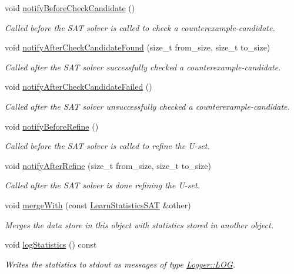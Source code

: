 \begin{DoxyCompactItemize}
void \hyperlink{classLearnStatisticsSAT_aafb51499184443e1c38eeec61370b96a}{notify\-Before\-Check\-Candidate} ()
\begin{DoxyCompactList}\small\item\em Called before the S\-A\-T solver is called to check a counterexample-\/candidate. \end{DoxyCompactList}\item 
void \hyperlink{classLearnStatisticsSAT_a229bd4450b739bc802dff5c43a8e212b}{notify\-After\-Check\-Candidate\-Found} (size\-\_\-t from\-\_\-size, size\-\_\-t to\-\_\-size)
\begin{DoxyCompactList}\small\item\em Called after the S\-A\-T solver successfully checked a counterexample-\/candidate. \end{DoxyCompactList}\item 
void \hyperlink{classLearnStatisticsSAT_a84d6d5295f13de1943cf236565f0d135}{notify\-After\-Check\-Candidate\-Failed} ()
\begin{DoxyCompactList}\small\item\em Called after the S\-A\-T solver unsuccessfully checked a counterexample-\/candidate. \end{DoxyCompactList}\item 
void \hyperlink{classLearnStatisticsSAT_a2734b3bcda5ca2195ecdb174d98a1433}{notify\-Before\-Refine} ()
\begin{DoxyCompactList}\small\item\em Called before the S\-A\-T solver is called to refine the U-\/set. \end{DoxyCompactList}\item 
void \hyperlink{classLearnStatisticsSAT_a0f5e0bc85daa6d051b1cd0144b1f5bda}{notify\-After\-Refine} (size\-\_\-t from\-\_\-size, size\-\_\-t to\-\_\-size)
\begin{DoxyCompactList}\small\item\em Called after the S\-A\-T solver is done refining the U-\/set. \end{DoxyCompactList}\item 
void \hyperlink{classLearnStatisticsSAT_a4dac4632cddd2726893c5709a556181b}{merge\-With} (const \hyperlink{classLearnStatisticsSAT}{Learn\-Statistics\-S\-A\-T} \&other)
\begin{DoxyCompactList}\small\item\em Merges the data store in this object with statistics stored in another object. \end{DoxyCompactList}\item 
void \hyperlink{classLearnStatisticsSAT_a8c66d3d4b1987b269e598037b689e09a}{log\-Statistics} () const 
\begin{DoxyCompactList}\small\item\em Writes the statistics to stdout as messages of type \hyperlink{classLogger_ac9e601f90bf326ce2088de52018861dca07be7495a7931bee16f5d94b3671f5de}{Logger\-::\-L\-O\-G}. \end{DoxyCompactList}\end{DoxyCompactItemize}

